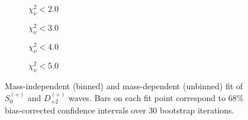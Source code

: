 \begin{figure}[htbp]
    \centering
    \begin{subfigure}{0.45\textwidth}
        
        \caption{$\chi^2_\nu < 2.0$}
    \end{subfigure}
    \hfill
    \begin{subfigure}{0.45\textwidth}
        
        \caption{$\chi^2_\nu < 3.0$}
    \end{subfigure}
    \vspace{1em}
    \begin{subfigure}{0.45\textwidth}
        
        \caption{$\chi^2_\nu < 4.0$}
    \end{subfigure}
    \hfill
    \begin{subfigure}{0.45\textwidth}
        
        \caption{$\chi^2_\nu < 5.0$}
    \end{subfigure}

    \caption{Mass-independent (binned) and mass-dependent (unbinned) fit of $S_{0}^{(+)}$ and $D_{+2}^{(+)}$ waves. Bars on each fit point correspond to $68\%$ bias-corrected confidence intervals over $ 30 $ bootstrap iterations.}
    \label{fig:unbinned-fit-all-Sp-D2p}
\end{figure}

